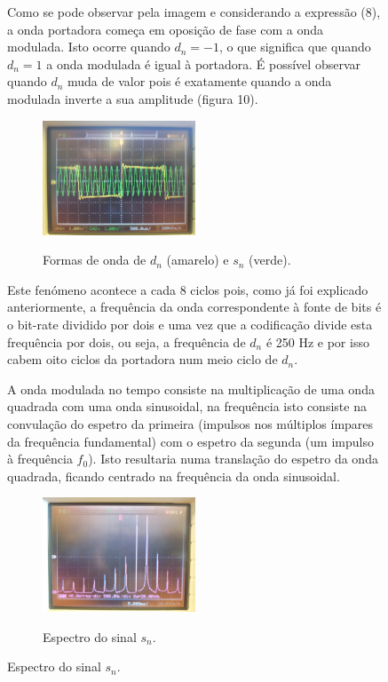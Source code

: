 \documentclass[11pt]{article}
\begin{document}
\begin{figure}[H]
\vspace{2 mm}

Como se pode observar pela imagem e considerando a expressão (8), a onda portadora começa em oposição de fase com a onda modulada. Isto ocorre quando $d_n=-1$, o que significa que quando $d_n=1$ a onda modulada é igual à portadora. É possível observar quando $d_n$ muda de valor pois é exatamente quando a onda modulada inverte a sua amplitude (figura 10). 


\begin{figure}[H]
	\centering
	\includegraphics[width=0.5\textwidth]{./dn_sn}~\\
	\caption{Formas de onda de $d_n$ (amarelo) e $s_n$ (verde).}
\end{figure}

Este fenómeno acontece a cada 8 ciclos pois, como já foi explicado anteriormente, a frequência da onda correspondente à fonte de bits é o bit-rate dividido por dois e uma vez que a codificação divide esta frequência por dois, ou seja, a frequência de $d_n$ é 250 Hz e por isso cabem oito ciclos da portadora num meio ciclo de $d_n$.

\vspace{2 mm}


A onda modulada no tempo consiste na multiplicação de uma onda quadrada com uma onda sinusoidal, na frequência isto consiste na convulação do espetro da primeira (impulsos nos múltiplos ímpares da frequência fundamental) com o espetro da segunda (um impulso à frequência $f_0$). Isto resultaria numa translação do espetro da onda quadrada, ficando centrado na frequência da onda sinusoidal.


\begin{figure}[H]
	\centering
	\includegraphics[width=0.5\textwidth]{./espetro_P2}~\\
	\caption{Espectro do sinal $s_n$.}
\end{figure}


\end{figure}
\end{document}
